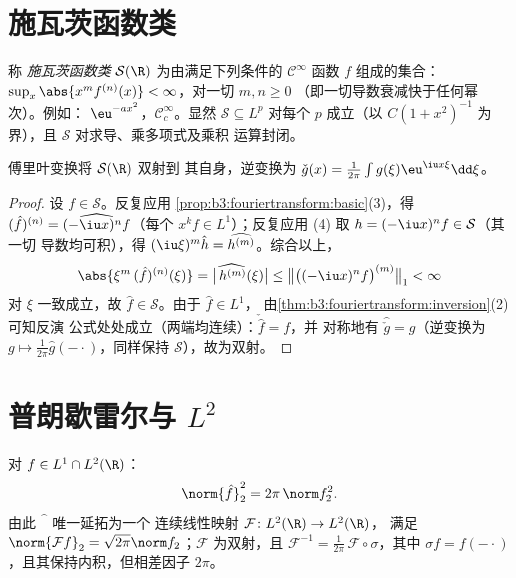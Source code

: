 \section{施瓦茨函数类}

\begin{definition}\label{def:b3:fouriertransform:schwartz}
称 \emph{施瓦茨函数类} $\mathcal
S(\R)$ 为由满足下列条件的 $\mathcal C^\infty$ 函数 $f$ 组成的集合：
$\sup_x\abs{x^m f^{(n)}(x)} < \infty$，对一切 $m, n \geq 0$
（即一切导数衰减快于任何幂次）。例如：
$\eu^{-ax^2}$，$\mathcal C_c^\infty$。显然 $\mathcal S
\subseteq L^p$ 对每个 $p$ 成立（以 $C(1 + x^2)^{-1}$ 为界），且
$\mathcal S$ 对求导、乘多项式及乘积
运算封闭。
\end{definition}

\begin{theorem}\label{thm:b3:fouriertransform:schwartz}
傅里叶变换将 $\mathcal S(\R)$ 双射到
其自身，逆变换为 $\check g(x) = \frac1{2\pi}\int
g(\xi)\eu^{\iu x\xi}\dd\xi$。
\end{theorem}

\begin{proof}
设 $f \in \mathcal S$。反复应用
\cref{prop:b3:fouriertransform:basic}(3)，得 $(\hat f)^{(n)} =
\widehat{(-\iu x)^nf}$（每个 $x^kf \in L^1$）；反复应用 (4)
取 $h = (-\iu x)^nf \in \mathcal S$（其一切
导数均可积），得 $(\iu\xi)^m\hat h =
\widehat{h^{(m)}}$。综合以上，
\[
\abs{\xi^m\,(\hat f)^{(n)}(\xi)}
= \bigl|\widehat{\,h^{(m)}}(\xi)\bigr|
\leq \bigl\|\bigl((-\iu x)^nf\bigr)^{(m)}\bigr\|_1 < \infty
\]
对 $\xi$ 一致成立，故 $\hat f \in \mathcal S$。由于 $\hat f \in L^1$，
由\cref{thm:b3:fouriertransform:inversion}(2)可知反演
公式处处成立（两端均连续）：$\check{\hat f} = f$，并
对称地有 $\widehat{\check g} = g$（逆变换为
$g \mapsto \frac1{2\pi}\hat g(-\cdot)$，同样保持
$\mathcal S$），故为双射。
\end{proof}

\section{普朗歇雷尔与 \texorpdfstring{$L^2$}{L2}}

\begin{theorem}[普朗歇雷尔]\label{thm:b3:fouriertransform:plancherel}
对 $f \in L^1 \cap L^2(\R)$：
\[
\norm{\hat f}_2^2 = 2\pi\,\norm f_2^2 .
\]
由此 $\widehat{\phantom f}$ 唯一延拓为一个
连续线性映射 $\mathcal F \colon L^2(\R) \to L^2(\R)$，
满足 $\norm{\mathcal Ff}_2 = \sqrt{2\pi}\norm f_2$；$\mathcal
F$ 为双射，且 $\mathcal F^{-1} =
\frac1{2\pi}\,\mathcal F\circ\sigma$，其中 $\sigma f =
f(-\cdot)$，且其保持内积，但相差因子
$2\pi$。
\end{theorem}

